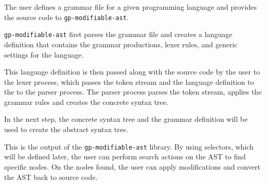The user defines a grammar file for a given programming language and provides the source code to \verb|gp-modifiable-ast|.

\verb|gp-modifiable-ast| first parses the grammar file and creates a language definition that contains the grammar productions, lexer rules, and generic settings for the language.

This language definition is then passed along with the source code by the user to the lexer process, 
which passes the token stream and the language definition to the
to the parser process. The parser process parses the token stream, applies the grammar rules and creates the concrete syntax tree.

In the next step, the concrete syntax tree and the grammar definition will be used to create the abstract syntax tree.

This is the output of the \verb|gp-modifiable-ast| library. By using selectors, which will be defined later, 
the user can perform search actions on the AST to find
specific nodes. On the nodes found, the user can apply modifications and convert the AST back to source code.

